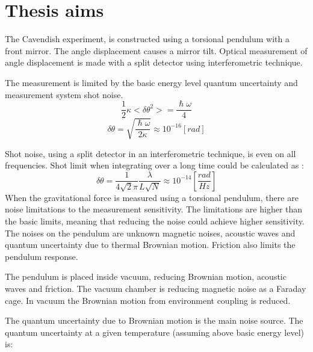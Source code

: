 \documentclass[\main/master.tex]{subfiles}
\begin{document}
\chapter{Thesis aims}\label{chapter:Thesis aims}

The Cavendish experiment, is constructed using a torsional pendulum with a front mirror. The angle displacement causes a mirror tilt. Optical measurement of angle displacement is made with a split detector using interferometric technique.
\par\noindent
The measurement is limited by the basic energy level quantum uncertainty and measurement system shot noise.
\begin{equation}
\frac{1}{2}\kappa <\delta\theta^2>= \frac{\hslash\omega}{4}    \label{eqn:basic uncertainty}
\end{equation}
\begin{equation}
\delta\theta= \sqrt{\frac{\hslash\omega}{2\kappa}} \approx 10^{-16} [rad]    \label{eqn:basic uncertainty}
\end{equation}

\noindent
Shot noise, using a split detector in an interferometric technique, is even on all frequencies. Shot limit when integrating over a long time could be calculated as \cite{howell2019}:
\begin{equation}
\delta\theta = \frac{1}{4\sqrt{2}\pi}\frac{\lambda}{L\sqrt{N}} \approx
10^{-14} [\frac{rad}{Hz}]    \label{eqn:gravitation_torque}
\end{equation}
When the gravitational force is measured using a torsional pendulum, there are noise limitations to the measurement sensitivity. The limitations are higher than the basic limits, meaning that reducing the noise could achieve higher sensitivity. The noises on the pendulum are unknown magnetic noises, acoustic waves and quantum uncertainty due to thermal Brownian motion. Friction also limits the pendulum response. 
\par\noindent
The pendulum is placed inside vacuum, reducing Brownian motion, acoustic waves and friction. The vacuum chamber is reducing magnetic noise as a Faraday cage. In vacuum the Brownian motion from environment coupling is reduced.
\par\noindent
The quantum uncertainty due to Brownian motion is the main noise source. The quantum uncertainty at a given temperature (assuming above basic energy level) is:
\end{document}
